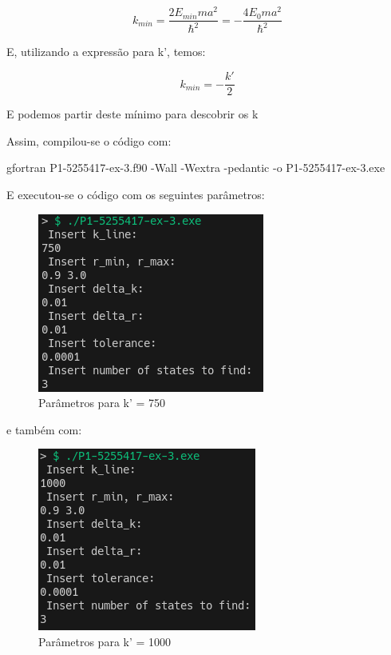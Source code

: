 \documentclass[12pt, a4paper]{article} %
\begin{document}
            \begin{equation}
                k_{min} = \frac{2E_{min}ma^2}{\hbar^{2}} = - \frac{4E_{0}ma^2}{\hbar^{2}}
            \end{equation}

            E, utilizando a expressão para k', temos:

            \begin{equation}
                k_{min} = -\frac{k'}{2}
            \end{equation}

            E podemos partir deste m\'inimo para descobrir os k

            Assim, compilou-se o código com:

            gfortran P1-5255417-ex-3.f90 -Wall -Wextra -pedantic -o P1-5255417-ex-3.exe

            E executou-se o código com os seguintes parâmetros:
            \begin{figure}[H]
                \centering
                \includegraphics[scale=0.7]{../images/ex3-750-parameters.png}
                \caption{Par\^ametros para k' = 750}
            \end{figure}
            e tamb\'em com:
            \begin{figure}[H]
                \centering
                \includegraphics[scale=0.7]{../images/ex3-1000-parameters.png}
                \caption{Par\^ametros para k' = 1000}
            \end{figure}
              
\end{document}
